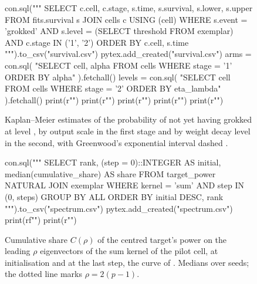 \documentclass[a4paper,11pt]{article} %
\begin{document}
\begin{figure}[t]
  \centering
\begin{pycode}
con.sql("""
    SELECT c.cell, c.stage, s.time, s.survival, s.lower, s.upper
    FROM fits.survival s JOIN cells c USING (cell)
    WHERE s.event = 'grokked'
        AND s.level = (SELECT threshold FROM exemplar)
        AND c.stage IN ('1', '2')
    ORDER BY c.cell, s.time
""").to_csv("survival.csv")
pytex.add_created("survival.csv")
arms = con.sql(
    "SELECT cell, alpha FROM cells WHERE stage = '1' ORDER BY alpha"
).fetchall()
levels = con.sql(
    "SELECT cell FROM cells WHERE stage = '2' ORDER BY eta_lambda"
).fetchall()
print(r"\def\armcells{" + ",".join(str(c) for c, _ in arms) + "}")
print(r"\def\armlegend{" + ",".join(rf"{{$\alpha={a}$}}" for _, a in arms) + "}")
print(r"\def\levelcells{" + ",".join(str(c) for (c,) in levels) + "}")
print(r"\def\levellegend{"
      + ",".join(f"{{level {k}}}" for k in range(1, len(levels) + 1)) + "}")
print(r"")
\end{pycode}
  \caption{Kaplan--Meier estimates of the probability of not yet having grokked
    at level , by output scale in the first stage and by
    weight decay level in the second, with Greenwood's exponential interval
  dashed \citep[Sec.~1.4.1]{kalbfleischStatisticalAnalysisFailure2002}.}
  \label{fig:survival}
\end{figure}

\begin{figure}[t]
  \centering
\begin{pycode}
con.sql("""
    SELECT rank, (step = 0)::INTEGER AS initial,
        median(cumulative_share) AS share
    FROM target_power NATURAL JOIN exemplar
    WHERE kernel = 'sum' AND step IN (0, steps)
    GROUP BY ALL
    ORDER BY initial DESC, rank
""").to_csv("spectrum.csv")
pytex.add_created("spectrum.csv")
print(rf"\def\leading{{{2 * (cell['p'] - 1)}}}")
print(r"")
\end{pycode}
  \caption{Cumulative share $C(\rho)$ of the centred target's power on the
    leading $\rho$ eigenvectors of the sum kernel of the pilot cell, at
    initialisation and at the last step, the curve of
    \citet[Eq.~6, Fig.~1e]{canatarSpectralBiasTaskModel2021}. Medians over
   seeds; the dotted line marks $\rho=2(p-1)$.}
  \label{fig:spectrum}
\end{figure}
\end{document}
